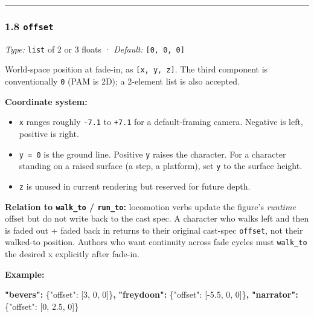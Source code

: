 \documentclass[
  12pt,
  letterpaper,
]{book}
\newenvironment{Shaded}{}{}
\newcommand{\DataTypeTok}[1]{\textcolor[rgb]{0.56,0.13,0.00}{#1}}
\newcommand{\DecValTok}[1]{\textcolor[rgb]{0.25,0.63,0.44}{#1}}
\newcommand{\ErrorTok}[1]{\textcolor[rgb]{1.00,0.00,0.00}{\textbf{#1}}}
\newcommand{\FloatTok}[1]{\textcolor[rgb]{0.25,0.63,0.44}{#1}}
\newcommand{\FunctionTok}[1]{\textcolor[rgb]{0.02,0.16,0.49}{#1}}
\newcommand{\OtherTok}[1]{\textcolor[rgb]{0.00,0.44,0.13}{#1}}
\providecommand{\tightlist}{%
  \setlength{\itemsep}{0pt}\setlength{\parskip}{0pt}}
\begin{document}
\begin{center}\rule{0.5\linewidth}{0.5pt}\end{center}

\subsubsection{\texorpdfstring{1.8
\texttt{offset}}{1.8 offset}}\label{offset}

\emph{Type:} \texttt{list} of 2 or 3 floats · \emph{Default:}
\texttt{{[}0,\ 0,\ 0{]}}

World-space position at fade-in, as \texttt{{[}x,\ y,\ z{]}}. The third
component is conventionally \texttt{0} (PAM is 2D); a 2-element list is
also accepted.

\textbf{Coordinate system:}

\begin{itemize}
\tightlist
\item
  \texttt{x} ranges roughly \texttt{-7.1} to \texttt{+7.1} for a
  default-framing camera. Negative is left, positive is right.
\item
  \texttt{y\ =\ 0} is the ground line. Positive \texttt{y} raises the
  character. For a character standing on a raised surface (a step, a
  platform), set \texttt{y} to the surface height.
\item
  \texttt{z} is unused in current rendering but reserved for future
  depth.
\end{itemize}

\textbf{Relation to \texttt{walk\_to} / \texttt{run\_to}:} locomotion
verbs update the figure's \emph{runtime} offset but do not write back to
the cast spec. A character who walks left and then is faded out + faded
back in returns to their original cast-spec \texttt{offset}, not their
walked-to position. Authors who want continuity across fade cycles must
\texttt{walk\_to} the desired x explicitly after fade-in.

\textbf{Example:}

\begin{Shaded}
\begin{Highlighting}[]
\ErrorTok{"bevers":}  \FunctionTok{\{}\DataTypeTok{"offset"}\FunctionTok{:} \OtherTok{[}\DecValTok{3}\OtherTok{,} \DecValTok{0}\OtherTok{,} \DecValTok{0}\OtherTok{]}\FunctionTok{\}}\ErrorTok{,}
\ErrorTok{"freydoon":} \FunctionTok{\{}\DataTypeTok{"offset"}\FunctionTok{:} \OtherTok{[}\FloatTok{{-}5.5}\OtherTok{,} \DecValTok{0}\OtherTok{,} \DecValTok{0}\OtherTok{]}\FunctionTok{\}}\ErrorTok{,}
\ErrorTok{"narrator":} \FunctionTok{\{}\DataTypeTok{"offset"}\FunctionTok{:} \OtherTok{[}\DecValTok{0}\OtherTok{,} \FloatTok{2.5}\OtherTok{,} \DecValTok{0}\OtherTok{]}\FunctionTok{\}}
\end{Highlighting}
\end{Shaded}
\end{document}
